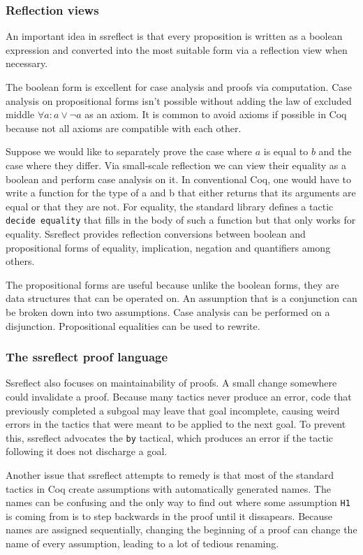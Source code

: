 \documentclass[english, 12pt, a4paper, sci, a-1b, online]{aaltothesis}
\newcommand\icoq[1]{\texttt{#1}}
\begin{document}
\subsubsection{Reflection views}

An important idea in ssreflect is that every proposition is written as a boolean expression and converted into the most suitable form via a reflection view when necessary.~\cite{mathcompbook}

The boolean form is excellent for case analysis and proofs via computation. Case analysis on propositional forms isn't possible without adding the law of excluded middle $\forall a : a \lor \lnot a$ as an axiom. It is common to avoid axioms if possible in Coq because not all axioms are compatible with each other.

Suppose we would like to separately prove the case where $a$ is equal to $b$ and the case where they differ. Via small-scale reflection we can view their equality as a boolean and perform case analysis on it. In conventional Coq, one would have to write a function for the type of a and b that either returns that its arguments are equal or that they are not. For equality, the standard library defines a tactic \icoq{decide equality} that fills in the body of such a function but that only works for equality. Ssreflect provides reflection conversions between boolean and propositional forms of equality, implication, negation and quantifiers among others.

The propositional forms are useful because unlike the boolean forms, they are data structures that can be operated on. An assumption that is a conjunction can be broken down into two assumptions. Case analysis can be performed on a disjunction. Propositional equalities can be used to rewrite.

\subsubsection{The ssreflect proof language}

Ssreflect also focuses on maintainability of proofs. A small change somewhere could invalidate a proof. Because many tactics never produce an error, code that previously completed a subgoal may leave that goal incomplete, causing weird errors in the tactics that were meant to be applied to the next goal. To prevent this, ssreflect advocates the \icoq{by} tactical, which produces an error if the tactic following it does not discharge a goal.

Another issue that ssreflect attempts to remedy is that most of the standard tactics in Coq create assumptions with automatically generated names. The names can be confusing and the only way to find out where some assumption \icoq{H1} is coming from is to step backwards in the proof until it dissapears. Because names are assigned sequentially, changing the beginning of a proof can change the name of every assumption, leading to a lot of tedious renaming.
\end{document}
